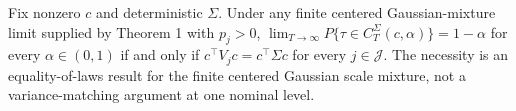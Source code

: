 Fix nonzero \(c\) and deterministic \(\Sigma\). Under any finite centered Gaussian-mixture limit supplied by Theorem 1 with \(p_j>0\), \(\lim_{T\to\infty}P\{\tau\in C_T^{\Sigma}(c,\alpha)\}=1-\alpha\) for every \(\alpha\in(0,1)\) if and only if \(c^\top V_jc=c^\top\Sigma c\) for every \(j\in\mathcal J\). The necessity is an equality-of-laws result for the finite centered Gaussian scale mixture, not a variance-matching argument at one nominal level.